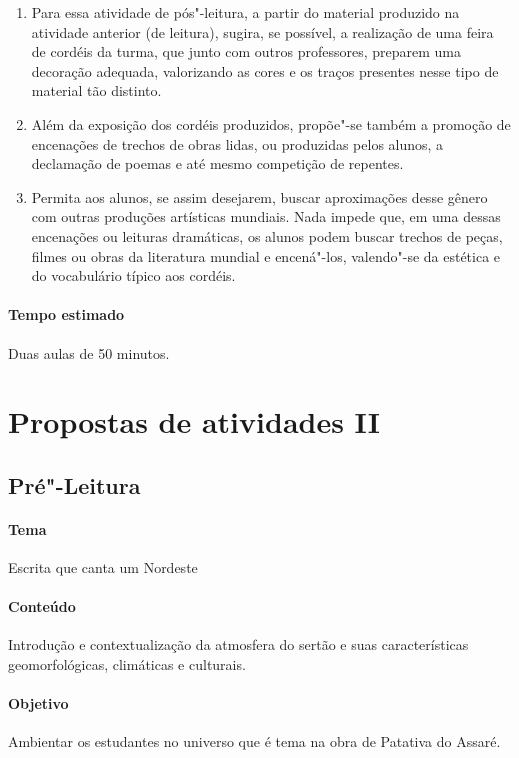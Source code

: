 \documentclass[12pt]{extarticle}
\begin{document}
\begin{enumerate}
\item
Para essa atividade de pós"-leitura, a partir do material produzido na 
atividade anterior (de leitura), sugira, se possível, a realização de 
uma feira de cordéis da turma, que junto com outros professores, preparem 
uma decoração adequada, valorizando as cores e os traços presentes nesse 
tipo de material tão distinto. 

\item
Além da exposição dos cordéis produzidos, propõe"-se também a
promoção de encenações de trechos de obras lidas, ou produzidas pelos
alunos, a declamação de poemas e até mesmo competição de repentes. 

\item
Permita aos alunos, se assim desejarem, buscar aproximações desse gênero 
com outras produções artísticas mundiais. Nada impede que, em uma dessas 
encenações ou leituras dramáticas, os alunos podem buscar trechos de peças, 
filmes ou obras da literatura mundial e encená"-los, valendo"-se da 
estética e do vocabulário típico aos cordéis.

\end{enumerate}

\paragraph{Tempo estimado} Duas aulas de 50 minutos. 

\section{Propostas de atividades II}

\subsection{Pré"-Leitura}

\paragraph{Tema} Escrita que canta um Nordeste 

\paragraph{Conteúdo} Introdução e contextualização da atmosfera do sertão 
e suas características geomorfológicas, climáticas e culturais. 

\paragraph{Objetivo} Ambientar os estudantes no universo que é tema na 
obra de Patativa do Assaré.
\end{document}
